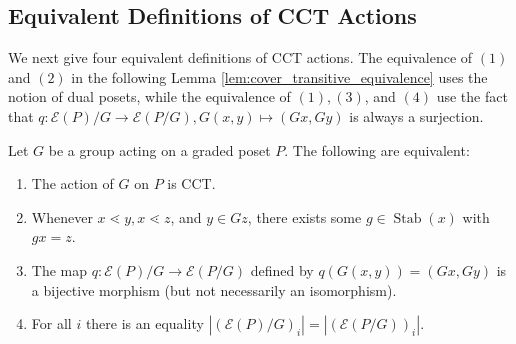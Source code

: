 \documentclass[smallextended, envcountsame, numbook]{svjour3}
\numberwithin{equation}{section}
\newcommand\ssec{\subsection}
\newcommand\Stab{\operatorname{Stab}}
\begin{document}
\ssec{Equivalent Definitions of CCT Actions}
\label{ssec:equivalent_defs}

We next give four equivalent definitions of CCT actions. The equivalence of $(1)$ and $(2)$ in the following Lemma \ref{lem:cover_transitive_equivalence} uses the notion of dual posets, while the equivalence of $(1),(3)$, and $(4)$ use the fact that $q\colon\mathcal E(P)/G \rightarrow \mathcal E(P/G),G(x,y)\mapsto (Gx,Gy)$ is always a surjection.

\begin{lemma}
\label{lem:cover_transitive_equivalence}
Let $G$ be a group acting on a graded poset $P$. The following are equivalent:
\begin{enumerate}
  \item The action of $G$ on $P$ is CCT.
  \item Whenever $x \lessdot y,x \lessdot z$, and $y \in Gz$, there exists some $g \in \Stab(x)$ with $gx = z$.
  \item The map $q\colon \mathcal E(P)/G\rightarrow \mathcal E(P/G)$ defined by $q(G(x, y)) = (Gx,Gy)$ is a bijective morphism (but not necessarily an isomorphism).
  \item For all $i$ there is an equality $|(\mathcal E(P)/G)_i|=| (\mathcal E(P/G))_i|$.
\end{enumerate}
\end{lemma}
\end{document}
